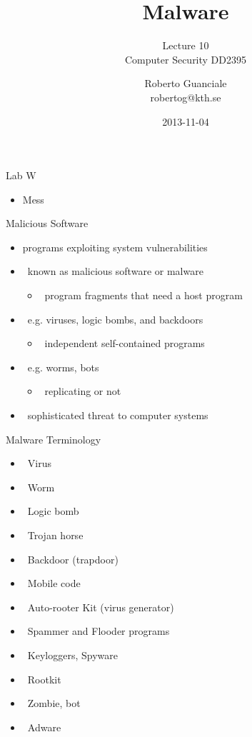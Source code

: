 \documentclass{beamer}
\title{Malware}
\subtitle{Lecture 10 \\ Computer Security DD2395}
\author[R. Guanciale]{
  Roberto Guanciale\\
  robertog@kth.se
}
\date{2013-11-04}
\begin{document}
\begin{frame}[plain]
  \titlepage
\end{frame}

\begin{frame}{Lab W}
  \begin{itemize}
  \item Mess
  \end{itemize}
\end{frame}

\begin{frame}{Malicious Software}
  \begin{itemize}
  \item programs exploiting system vulnerabilities 
  \item  known as malicious software or malware 
    \begin{itemize}
    \item  program fragments that need a host program  
    \end{itemize}
  \item  e.g. viruses, logic bombs, and backdoors 
    \begin{itemize}
    \item  independent self-contained programs 
    \end{itemize}
  \item  e.g. worms, bots 
    \begin{itemize}
    \item  replicating or not 
    \end{itemize}
  \item  sophisticated threat to computer systems 
  \end{itemize}
\end{frame}


\begin{frame}{Malware Terminology}
  \begin{itemize}
  \item  Virus 
  \item  Worm 
  \item  Logic bomb 
  \item  Trojan horse 
  \item  Backdoor (trapdoor)‏ 
  \item  Mobile code 
  \item  Auto-rooter Kit (virus generator)‏ 
  \item  Spammer and Flooder programs 
  \item  Keyloggers, Spyware 
  \item  Rootkit 
  \item  Zombie, bot 
  \item  Adware   
  \end{itemize}
\end{frame}
 
\end{document}
